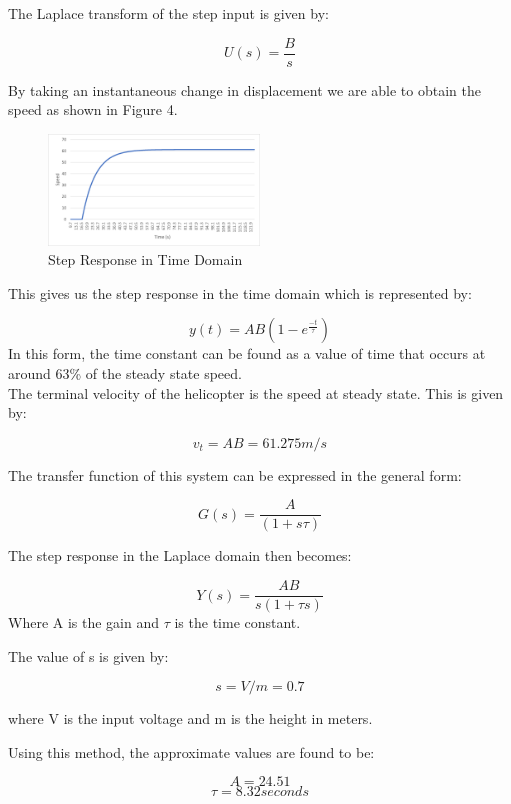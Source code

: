 \documentclass[12pt]{article}
\begin{document}
The Laplace transform of the step input is given by:

\[ U(s) = \frac{B}{s} \]

 By taking an instantaneous change in displacement we are able to obtain the speed as shown in Figure 4.
 \begin{figure}[H]
     \centering
     \includegraphics[width=0.5\textwidth]{outputmeas.png}
     \caption{Step Response in Time Domain}
     \label{fig:sample}
 \end{figure}
 
 This gives us the step response in the time domain which is represented by:
 
 \[
    y(t) = AB(1-e^{\frac{-t}{\tau}})
 \]
 In this form, the time constant can be found as a value of time that occurs at around 63\% of the steady state speed.\\
 
 The terminal velocity of the helicopter is the speed at steady state. This is given by:

\[ v_t = AB = 61.275 m/s \]

 The transfer function of this system can be expressed in the general form:

\[ G(s) = \frac{A}{(1+s\tau)} \]

The step response in the Laplace domain then becomes:

\[
    Y(s) = \frac{AB}{s(1+\tau s)}
\]
Where A is the gain and \( \tau \) is the time constant.

The value of s is given by:

\[ s = V/m = 0.7 \]

where V is the input voltage and m is the height in meters.

Using this method, the approximate values are found to be:

\[
    A = 24.51
\]
\[
    \tau = 8.32 seconds
\]

\end{document}
